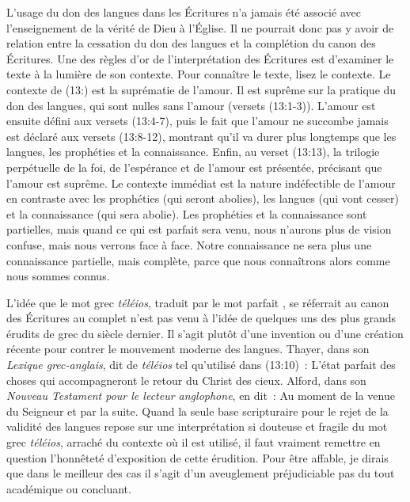 L'usage du don des langues dans les Écritures n'a jamais été associé
 avec l'enseignement de la vérité de Dieu à l'Église.
 Il ne pourrait donc pas y avoir de relation entre la cessation
 du don des langues et la complétion du canon des Écritures.
 Une des règles d'or de l'interprétation des Écritures est d'examiner
 le texte à la lumière de son contexte. Pour connaître le texte,
 lisez le contexte. Le contexte de (13:) est la suprématie
 de l'amour. Il est suprême sur la pratique du don des langues,
 qui sont nulles sans l'amour (versets (13:1-3)).
 L'amour est ensuite défini aux versets (13:4-7),
 puis le fait que l'amour ne succombe jamais est déclaré aux versets
 (13:8-12), montrant qu'il va durer plus longtemps
 que les langues, les prophéties et la connaissance.
 Enfin, au verset (13:13), la trilogie perpétuelle de la foi,
 de l'espérance et de l'amour est présentée, précisant que l'amour
 est suprême. Le contexte immédiat est la nature indéfectible de l'amour
 en contraste avec les prophéties (qui seront abolies), les langues
 (qui vont cesser) et la connaissance (qui sera abolie).
 Les prophéties et la connaissance sont partielles, mais quand ce qui
 est parfait sera venu, nous n'aurons plus de vision confuse,
 mais nous verrons face à face. Notre connaissance ne sera plus
 une connaissance partielle, mais complète, parce que nous connaîtrons
 alors comme nous sommes connus.

\begin{specialpar}{}
L'idée que le mot grec \emph{téléios}, traduit par le mot \og parfait \fg{},
 se réferrait au canon des Écritures au complet n'est pas venu
 à l'idée de quelques uns des plus grands érudits de grec du siècle dernier.
 Il s'agit plutôt d'une invention ou d'une création récente pour contrer
 le mouvement moderne des langues. Thayer, dans son
 \emph{Lexique grec-anglais},
 dit de \emph{téléios} tel qu'utilisé dans (13:10)~:
 \og L'état parfait des choses qui accompagneront le retour du Christ
 des cieux. \fg{} Alford, dans son \emph{Nouveau Testament pour le lecteur
 anglophone}, en dit~: \og Au moment de la venue du Seigneur et par la suite. \fg{}
 Quand la seule base scripturaire pour le rejet de la validité des langues
 repose sur une interprétation si douteuse et fragile du mot grec
 \emph{téléios}, arraché du contexte où il est utilisé, il faut vraiment
 remettre en question l'honnêteté d'exposition de cette érudition.
 Pour être affable, je dirais que dans le meilleur des cas il s'agit
 d'un aveuglement préjudiciable \ocadr pas du tout académique ou concluant.
\end{specialpar}

